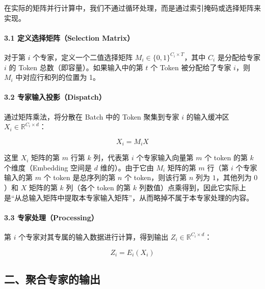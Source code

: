 在实际的矩阵并行计算中，我们不通过循环处理，而是通过索引掩码或选择矩阵来实现。

\hypertarget{ux5b9aux4e49ux9009ux62e9ux77e9ux9635selection-matrix}{%
\paragraph{3.1 定义选择矩阵（Selection Matrix）}\label{ux5b9aux4e49ux9009ux62e9ux77e9ux9635selection-matrix}}

对于第 \(i\) 个专家，定义一个二值选择矩阵 \(M_i \in \{0,1\}^{C_i \times T}\)，其中 \(C_i\) 是分配给专家 \(i\) 的 Token 总数（即容量）。如果输入中的第 \(t\) 个 Token 被分配给了专家 \(i\)，则 \(M_i\) 中对应行和列的位置为 1。

\hypertarget{ux4e13ux5bb6ux8f93ux5165ux6295ux5f71dispatch}{%
\paragraph{3.2 专家输入投影（Dispatch）}\label{ux4e13ux5bb6ux8f93ux5165ux6295ux5f71dispatch}}

通过矩阵乘法，将分散在 Batch 中的 Token 聚集到专家 \(i\) 的输入缓冲区 \(X_i \in \mathbb{R}^{C_i \times d}\)：

\[
X_i = M_iX
\]

这里 \(X_i\) 矩阵的第 \(m\) 行第 \(k\) 列，代表第 \(i\) 个专家输入向量第 \(m\) 个 token 的第 \(k\) 个维度（Embedding 空间是 \(d\) 维的）。由于它由 \(M_i\) 矩阵的第 \(m\) 行（第 \(i\) 个专家输入的第 \(m\) 个 token 是总序列的第 \(n\) 个 token，则该行第 \(n\) 列为 \(1\)，其他列为 \(0\)）和 \(X\) 矩阵的第 \(k\) 列（各个 token 的第 \(k\) 列数值）点乘得到，因此它实际上是``从总输入矩阵中提取本专家输入矩阵''，从而略掉不属于本专家处理的内容。

\hypertarget{ux4e13ux5bb6ux5904ux7406processing}{%
\paragraph{3.3 专家处理（Processing）}\label{ux4e13ux5bb6ux5904ux7406processing}}

第 \(i\) 个专家对其专属的输入数据进行计算，得到输出 \(Z_i \in \mathbb{R}^{C_i \times d}\)：

\[
Z_i = E_i(X_i)
\]

\hypertarget{ux4e8cux805aux5408ux4e13ux5bb6ux7684ux8f93ux51fa}{%
\subsection{二、聚合专家的输出}\label{ux4e8cux805aux5408ux4e13ux5bb6ux7684ux8f93ux51fa}}

